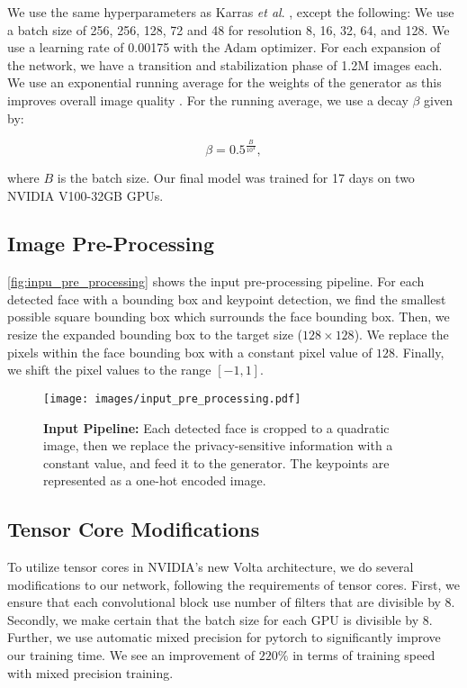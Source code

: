 \documentclass[runningheads]{llncs}
\newcommand{\etal}{\textit{et al}. }
\begin{document}
We use the same hyperparameters as Karras \etal \cite{Karras2017}, except the following:
We use a batch size of 256, 256, 128, 72 and 48 for resolution 8, 16, 32, 64, and 128.
We use a learning rate of 0.00175 with the Adam optimizer.
For each expansion of the network, we have a transition and stabilization phase of 1.2M images each.
We use an exponential running average for the weights of the generator as this improves overall image quality \cite{yazici2018unusual}.
For the running average, we use a decay $\beta$ given by:

\begin{equation}
\beta = 0.5^{\frac{B}{10^4}},
\end{equation}

where $B$ is the batch size.
Our final model was trained for 17 days on two NVIDIA V100-32GB GPUs. 

\subsection*{Image Pre-Processing}

\autoref{fig:inpu_pre_processing} shows the input pre-processing pipeline.
For each detected face with a bounding box and keypoint detection, we find the smallest possible square bounding box which surrounds the face bounding box. 
Then, we resize the expanded bounding box to the target size ($128 \times 128$).
We replace the pixels within the face bounding box with a constant pixel value of $128$.
Finally, we shift the pixel values to the range $[-1, 1]$. 



\begin{figure}
	\centering
	\texttt{[image: images/input\_pre\_processing.pdf]}
	\caption{\textbf{Input Pipeline:} Each detected face is cropped to a quadratic image, then we replace the privacy-sensitive information with a constant value, and feed it to the generator. The keypoints are represented as a one-hot encoded image.}
	\label{fig:inpu_pre_processing}
\end{figure}


\subsection*{Tensor Core Modifications}

To utilize tensor cores in NVIDIA's new Volta architecture, we do several modifications to our network, following the requirements of tensor cores.
First, we ensure that each convolutional block use number of filters that are divisible by 8. 
Secondly, we make certain that the batch size for each GPU is divisible by 8.
Further, we use automatic mixed precision for pytorch \cite{nvidia_apex} to significantly improve our training time.
We see an improvement of $220\%$ in terms of training speed with mixed precision training.


 

\end{document}
